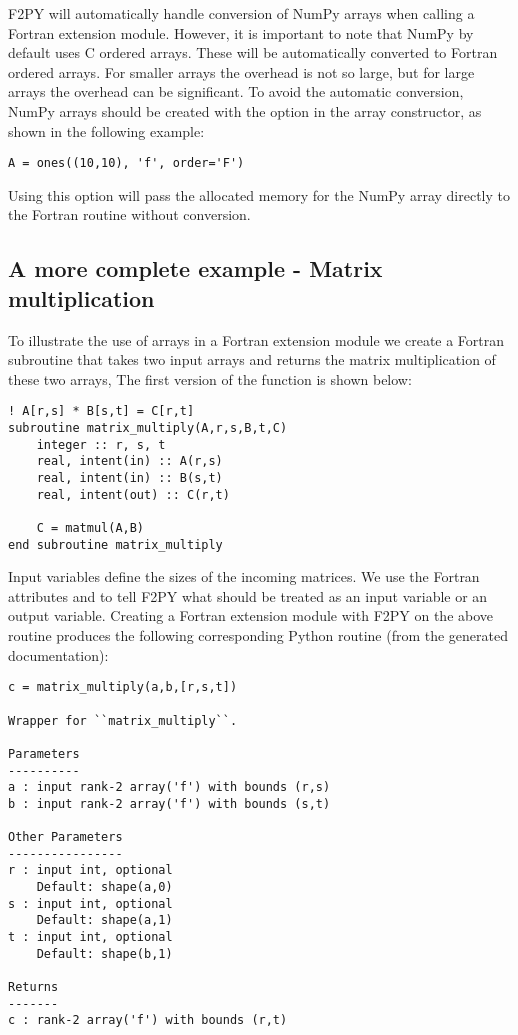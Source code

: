F2PY will automatically handle conversion of NumPy arrays when calling a Fortran extension module. However, it is important to note that NumPy by default uses C ordered arrays. These will be automatically converted to Fortran ordered arrays. For smaller arrays the overhead is not so large, but for large arrays the overhead can be significant. To avoid the automatic conversion, NumPy arrays should be created with the  option in the array constructor, as shown in the following example:

\pymode

\begin{lstlisting}
A = ones((10,10), 'f', order='F')
\end{lstlisting}

Using this option will pass the allocated memory for the NumPy array directly to the Fortran routine without conversion.

\subsection{A more complete example - Matrix multiplication}

To illustrate the use of arrays in a Fortran extension module we create a Fortran subroutine that takes two input arrays and returns the matrix multiplication of these two arrays, The first version of the function is shown below:

\fmode

\begin{lstlisting}
! A[r,s] * B[s,t] = C[r,t]
subroutine matrix_multiply(A,r,s,B,t,C)
	integer :: r, s, t
	real, intent(in) :: A(r,s)
	real, intent(in) :: B(s,t)
	real, intent(out) :: C(r,t)

	C = matmul(A,B)
end subroutine matrix_multiply
\end{lstlisting}

Input variables  define the sizes of the incoming matrices. We use the Fortran attributes  and  to tell F2PY what should be treated as an input variable or an output variable. Creating a Fortran extension module with F2PY on the above routine produces the following corresponding Python routine (from the generated documentation):

\cmdmode

\begin{lstlisting}
c = matrix_multiply(a,b,[r,s,t])

Wrapper for ``matrix_multiply``.

Parameters
----------
a : input rank-2 array('f') with bounds (r,s)
b : input rank-2 array('f') with bounds (s,t)

Other Parameters
----------------
r : input int, optional
    Default: shape(a,0)
s : input int, optional
    Default: shape(a,1)
t : input int, optional
    Default: shape(b,1)

Returns
-------
c : rank-2 array('f') with bounds (r,t)
\end{lstlisting}

